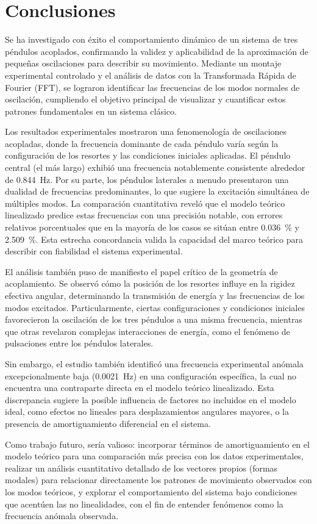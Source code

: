 \section{Conclusiones}

Se ha investigado con \'exito el comportamiento din\'amico
de un sistema de tres p\'endulos acoplados, confirmando la validez y
aplicabilidad de la aproximaci\'on de peque\~nas oscilaciones para
describir su movimiento. Mediante un montaje experimental controlado y
el an\'alisis de datos con la Transformada R\'apida de Fourier (FFT),
se lograron identificar las frecuencias de los modos normales de
oscilaci\'on, cumpliendo el objetivo principal de visualizar y
cuantificar estos patrones fundamentales en un sistema cl\'asico.

Los resultados experimentales mostraron una fenomenolog\'ia de
oscilaciones acopladas, donde la frecuencia dominante de cada p\'endulo
var\'ia seg\'un la configuraci\'on de los resortes y las condiciones
iniciales aplicadas. El p\'endulo central (el m\'as largo) exhibi\'o
una frecuencia notablemente consistente alrededor de \qty{0.844}{\Hz}.
Por su parte, los p\'endulos laterales a menudo presentaron una
dualidad de frecuencias predominantes, lo que sugiere la excitaci\'on
simult\'anea de m\'ultiples modos. La comparaci\'on cuantitativa revel\'o
que el modelo te\'orico linealizado predice estas frecuencias con
una precisi\'on notable, con errores relativos porcentuales que en
la mayor\'ia de los casos se sit\'uan entre \qty{0.036}{\percent} y
\qty{2.509}{\percent}. Esta estrecha concordancia valida la capacidad
del marco te\'orico para describir con fiabilidad el sistema
experimental.

El an\'alisis tambi\'en puso de manifiesto el papel cr\'itico de la
geometr\'ia de acoplamiento. Se observ\'o c\'omo la posici\'on de los
resortes influye en la rigidez efectiva angular, determinando la
transmisi\'on de energ\'ia y las frecuencias de los modos excitados.
Particularmente, ciertas configuraciones y condiciones iniciales
favorecieron la oscilaci\'on de los tres p\'endulos a una misma
frecuencia, mientras que otras revelaron complejas interacciones de
energ\'ia, como el fen\'omeno de pulsaciones entre los p\'endulos
laterales.

Sin embargo, el estudio tambi\'en identific\'o una frecuencia
experimental an\'omala excepcionalmente baja (\qty{0.0021}{\Hz}) en
una configuraci\'on espec\'ifica, la cual no encuentra una
contraparte directa en el modelo te\'orico linealizado. Esta
discrepancia sugiere la posible influencia de factores no incluidos
en el modelo ideal, como efectos no lineales para desplazamientos
angulares mayores, o la presencia de amortiguamiento diferencial en
el sistema.

Como trabajo futuro, ser\'ia valioso: incorporar t\'erminos de
amortiguamiento en el modelo te\'orico para una comparaci\'on m\'as
precisa con los datos experimentales, realizar un an\'alisis
cuantitativo detallado de los vectores propios (formas modales) para
relacionar directamente los patrones de movimiento observados con los
modos te\'oricos, y explorar el comportamiento del sistema bajo
condiciones que acent\'uen las no linealidades, con el fin de entender
fen\'omenos como la frecuencia an\'omala observada.
